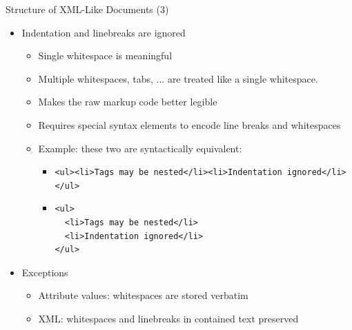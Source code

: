 \begin{frame}[fragile]{Structure of XML-Like Documents (3)}
%
\begin{itemize}
\item Indentation and linebreaks are ignored
	\begin{itemize}
	\item Single whitespace is meaningful
	\item Multiple whitespaces, tabs, ... are treated like a single whitespace.
	\item Makes the raw markup code better legible
	\item Requires special syntax elements to encode line breaks and whitespaces
	\item Example: these two are syntactically equivalent:
		\begin{itemize}
		\item \texttt{<ul><li>Tags may be nested</li><li>Indentation ignored</li></ul>}
		\item \begin{verbatim}
<ul>
  <li>Tags may be nested</li>
  <li>Indentation ignored</li>
</ul>
		\end{verbatim}
		\end{itemize}
	\end{itemize}
\pause
\item Exceptions
	\begin{itemize}
	\item Attribute values: whitespaces are stored verbatim
	\item XML: whitespaces and linebreaks in contained text preserved
	\end{itemize}
\end{itemize}
%
\end{frame}


